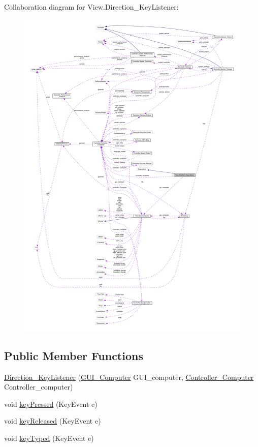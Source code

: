 Collaboration diagram for View.\+Direction\+\_\+\+Key\+Listener\+:
\nopagebreak
\begin{figure}[H]
\begin{center}
\leavevmode
\includegraphics[width=350pt]{class_view_1_1_direction___key_listener__coll__graph}
\end{center}
\end{figure}
\subsection*{Public Member Functions}
\begin{DoxyCompactItemize}
\item 
\hyperlink{class_view_1_1_direction___key_listener_a8adb7d250eed421136d52519b3e99770}{Direction\+\_\+\+Key\+Listener} (\hyperlink{class_view_1_1_g_u_i___computer}{G\+U\+I\+\_\+\+Computer} G\+U\+I\+\_\+computer, \hyperlink{class_controller_1_1_controller___computer}{Controller\+\_\+\+Computer} Controller\+\_\+computer)
\item 
void \hyperlink{class_view_1_1_direction___key_listener_a330da76dc27e35eaa7d2c5c6699ebab8}{key\+Pressed} (Key\+Event e)
\item 
void \hyperlink{class_view_1_1_direction___key_listener_abb54afb2ce915a7285c49a59f5359bc4}{key\+Released} (Key\+Event e)
\item 
void \hyperlink{class_view_1_1_direction___key_listener_a94e7c5f6db2ebb0df2b65fa3398cda3f}{key\+Typed} (Key\+Event e)
\end{DoxyCompactItemize}


